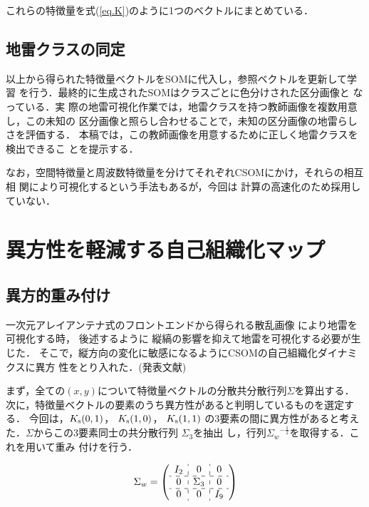 ﻿\documentclass[12pt,oneside]{jsbook}
\begin{document}
これらの特徴量を式(\ref{eq.K})のように1つのベクトルにまとめている．

\subsection{地雷クラスの同定}
以上から得られた特徴量ベクトルをSOMに代入し，参照ベクトルを更新して学習
を行う．最終的に生成されたSOMはクラスごとに色分けされた区分画像と
なっている．実
際の地雷可視化作業では，地雷クラスを持つ教師画像を複数用意し，この未知の
区分画像と照らし合わせることで，未知の区分画像の地雷らしさを評価する\cite{2010Nakano}．
本稿では，この教師画像を用意するために正しく地雷クラスを検出できるこ
とを提示する．

なお，空間特徴量と周波数特徴量を分けてそれぞれCSOMにかけ，それらの相互相
 関により可視化するという手法もある\cite{ejiri}が，今回は
計算の高速化のため採用していない．
\newpage
\section{異方性を軽減する自己組織化マップ}
\subsection{異方的重み付け}
一次元アレイアンテナ式のフロントエンドから得られる散乱画像
により地雷を可視化する時，
後述するように
縦縞の影響を抑えて地雷を可視化する必要が生じた．
そこで，縦方向の変化に敏感になるようにCSOMの自己組織化ダイナミクスに異方
性をとり入れた．(発表文献\cite{koyama})

まず，全ての$(x,y)$について特徴量ベクトルの分散共分散行列$\Sigma$を算出する．
次に，特徴量ベクトルの要素のうち異方性があると判明しているものを選定する．
今回は，$K_{{\rm s}}(0,1)$，
$K_{{\rm s}}(1,0)$，
$K_{{\rm s}}(1,1)$
の3要素の間に異方性があると考えた．$\Sigma$からこの3要素同士の共分散行列
$\Sigma_3$を抽出
し，行列${\Sigma_w}^{-\frac{1}{2}}$を取得する．これを用いて重み
付けを行う．

\begin{equation}
\Sigma_w = \left(\begin{array}{c:c:c}
	   I_2&\Large{0} &\Large{0} \\
\hdashline %
\Large{0} &\Sigma_3& \Large{0}\\
\hdashline %
\Large{0}&\Large{0} &I_9
		\end{array}
\right) 
\end{equation}
\end{document}
